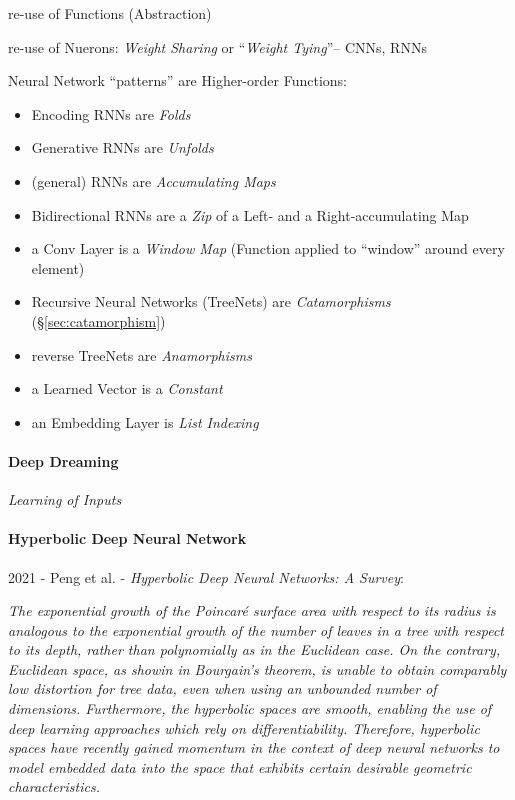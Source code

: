 re-use of Functions (Abstraction)

re-use of Nuerons: \emph{Weight Sharing} or ``\emph{Weight Tying}''-- CNNs, RNNs

Neural Network ``patterns'' are Higher-order Functions:
\begin{itemize}
  \item Encoding RNNs are \emph{Folds}
  \item Generative RNNs are \emph{Unfolds}
  \item (general) RNNs are \emph{Accumulating Maps}
  \item Bidirectional RNNs are a \emph{Zip} of a Left- and a Right-accumulating
    Map
  \item a Conv Layer is a \emph{Window Map} (Function applied to ``window''
    around every element)
  \item Recursive Neural Networks (TreeNets) are \emph{Catamorphisms}
    (\S\ref{sec:catamorphism})
  \item reverse TreeNets are \emph{Anamorphisms}
  \item a Learned Vector is a \emph{Constant}
  \item an Embedding Layer is \emph{List Indexing}
\end{itemize}



\paragraph{Deep Dreaming}\label{sec:deep_dreaming}\hfill

\emph{Learning of Inputs}



\paragraph{Hyperbolic Deep Neural Network}\label{sec:hyperbolic_dnn}\hfill

2021 - Peng et al. - \emph{Hyperbolic Deep Neural Networks: A Survey}:

\emph{
  The exponential growth of the Poincar\'e surface area with respect to its
  radius is analogous to the exponential growth of the number of leaves in a
  tree with respect to its depth, rather than polynomially as in the Euclidean
  case. On the contrary, Euclidean space, as showin in Bourgain's theorem, is
  unable to obtain comparably low distortion for tree data, even when using an
  unbounded number of dimensions. Furthermore, the hyperbolic spaces are smooth,
  enabling the use of deep learning approaches which rely on differentiability.
  Therefore, hyperbolic spaces have recently gained momentum in the context of
  deep neural networks to model embedded data into the space that exhibits
  certain desirable geometric characteristics.
}

